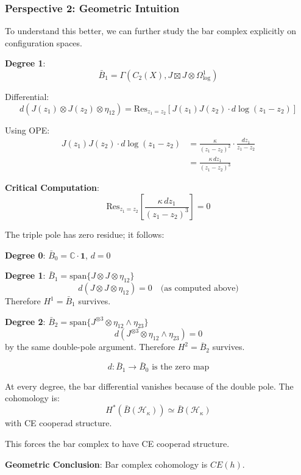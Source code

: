 \subsubsection{Perspective 2: Geometric Intuition}

To understand this better, we can further study the bar complex explicitly on configuration spaces.

\textbf{Degree 1}: 
$$\bar{B}_1 = \Gamma(C_2(X), J \boxtimes J \otimes \Omega^1_{\log})$$

Differential:
$$d(J(z_1) \otimes J(z_2) \otimes \eta_{12}) = \text{Res}_{z_1=z_2}[J(z_1)J(z_2) \cdot d\log(z_1-z_2)]$$

Using OPE:
\begin{align}
J(z_1)J(z_2) \cdot d\log(z_1-z_2) &= \frac{\kappa}{(z_1-z_2)^2} \cdot \frac{dz_1}{z_1-z_2} \\
&= \frac{\kappa \, dz_1}{(z_1-z_2)^3}
\end{align}

\textbf{Critical Computation}:
$$\text{Res}_{z_1=z_2}\left[\frac{\kappa \, dz_1}{(z_1-z_2)^3}\right] = 0$$

The triple pole has zero residue;  it follows:

\textbf{Degree 0}: $\bar{B}_0 = \mathbb{C} \cdot \mathbf{1}$, $d = 0$

\textbf{Degree 1}: $\bar{B}_1 = \text{span}\{J \otimes J \otimes \eta_{12}\}$
$$d(J \otimes J \otimes \eta_{12}) = 0 \quad \text{(as computed above)}$$
Therefore $H^1 = \bar{B}_1$ survives.

\textbf{Degree 2}: $\bar{B}_2 = \text{span}\{J^{\otimes 3} \otimes \eta_{12} \wedge \eta_{23}\}$
$$d(J^{\otimes 3} \otimes \eta_{12} \wedge \eta_{23}) = 0$$
by the same double-pole argument. Therefore $H^2 = \bar{B}_2$ survives.



$$d: \bar{B}_1 \to \bar{B}_0 \text{ is the zero map}$$

At every degree, the bar differential vanishes because of the double pole.
The cohomology is:
$$H^*(\bar{B}(\mathcal{H}_\kappa)) \simeq \bar{B}(\mathcal{H}_\kappa)$$
with CE cooperad structure.


This forces the bar complex to have CE cooperad structure.

\textbf{Geometric Conclusion}: Bar complex cohomology is $CE(h)$.





